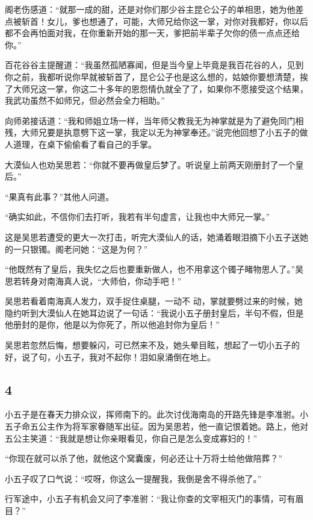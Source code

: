 阁老伤感道：“就那一成的甜，还是对你们那少谷主昆仑公子的单相思，她为他差点被斩首！女儿，爹也想通了，可能，大师兄给你这一掌，对你对我都好，你以后都不会再怕面对我，在你重新开始的那一天，爹把前半辈子欠你的债一点点还给你。”

百花谷谷主提醒道：“我虽然孤陋寡闻，但是当今皇上毕竟是我百花谷的人，见到你之前，我都听说你早就被斩首了，昆仑公子也是这么想的，姑娘你要想清楚，挨了大师兄这一掌，你这二十多年的恩怨情仇就全了了，如果你不愿接受这个结果，我武功虽然不如师兄，但必然会全力相助。”

向师弟接话道：“我和师姐立场一样，当年师父教我无为神掌就是为了避免同门相残，大师兄要是执意劈下这一掌，我定以无为神掌奉还。”说完他回想了小五子的做人道理，在桌下偷偷看了看自己的手掌。

大漠仙人也劝吴思若：“你就不要再做皇后梦了。听说皇上前两天刚册封了一个皇后。”

“果真有此事？”其他人问道。

“确实如此，不信你们去打听，我若有半句虚言，让我也中大师兄一掌。”

这是吴思若遭受的更大一次打击，听完大漠仙人的话，她涌着眼泪摘下小五子送她的一只银镯。阁老问她：“这是为何？”

“他既然有了皇后，我失忆之后也要重新做人，也不用拿这个镯子睹物思人了。”吴思若转身对南海真人说，“大师伯，你动手吧！”

吴思若看着南海真人发力，双手捉住桌腿，一动不
动，掌就要劈过来的时候，她隐约听到大漠仙人在她耳边说了一句话：“我说小五子册封皇后，半句不假，但是他册封的是你，他是以为你死了，所以他追封你为皇后！”

吴思若忽然后悔，想要躲闪，可已然来不及，她头晕目眩，想起了一切小五子的好，说了句，小五子，我对不起你！泪如泉涌倒在地上。
\newline

{\centering\subsection{4}}

小五子是在春天力排众议，挥师南下的。此次讨伐海南岛的开路先锋是李准驸。小五子命五公主作为将军家眷随军出征。因为吴思若，他一直记恨着她。路上，他对五公主笑道：“我就是想让你亲眼看见，你自己是怎么变成寡妇的！”

“你现在就可以杀了他，就他这个窝囊废，何必还让十万将士给他做陪葬？”

小五子叹了口气说：“哎呀，你这么一提醒我，我倒是舍不得杀他了。”

行军途中，小五子有机会又问了李准驸：“我让你查的文宰相灭门的事情，可有眉目？”

